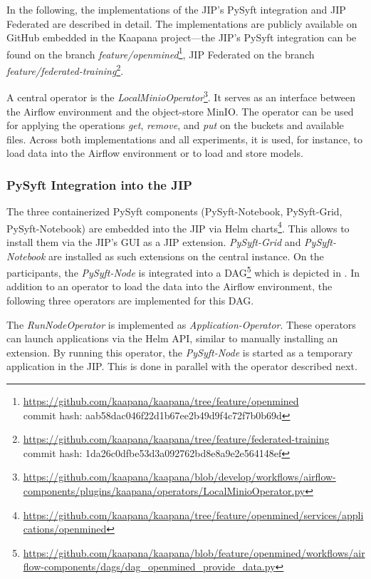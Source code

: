 In the following, the implementations of the JIP's PySyft integration and JIP Federated are described in detail.
The implementations are publicly available on GitHub embedded in the Kaapana project---the JIP's PySyft integration can be found on the branch \textit{feature/openmined}\footnote{\url{https://github.com/kaapana/kaapana/tree/feature/openmined}\\ commit hash: aab58dac046f22d1b67ee2b49d9f4c72f7b0b69d}, JIP Federated on the branch \textit{feature/federated-training}\footnote{\url{https://github.com/kaapana/kaapana/tree/feature/federated-training}\\ commit hash: 1da26c0dfbe53d3a092762bd8e8a9e2e564148ef}.

A central operator is the \textit{LocalMinioOperator}\footnote{\url{https://github.com/kaapana/kaapana/blob/develop/workflows/airflow-components/plugins/kaapana/operators/LocalMinioOperator.py}}. It serves as an interface between the Airflow environment and the object-store MinIO. The operator can be used for applying the operations \textit{get}, \textit{remove}, and \textit{put} on the buckets and available files. Across both implementations and all experiments, it is used, for instance, to load data into the Airflow environment or to load and store models.

\subsubsection{PySyft Integration into the JIP}

The three containerized PySyft components (PySyft-Notebook, PySyft-Grid, PySyft-Notebook) are embedded into the JIP via Helm charts\footnote{\url{https://github.com/kaapana/kaapana/tree/feature/openmined/services/applications/openmined}}. This allows to install them via the JIP's GUI as a JIP extension. \textit{PySyft-Grid} and \textit{PySyft-Notebook} are installed as such extensions on the central instance.
On the participants, the \textit{PySyft-Node} is integrated into a DAG\footnote{\url{https://github.com/kaapana/kaapana/blob/feature/openmined/workflows/airflow-components/dags/dag_openmined_provide_data.py}} which is depicted in . In addition to an operator to load the data into the Airflow environment, the following three operators are implemented for this DAG.

The \textit{RunNodeOperator} is implemented as \textit{Application-Operator}. These operators can launch applications via the Helm API, similar to manually installing an extension. By running this operator, the \textit{PySyft-Node} is started as a temporary application in the JIP. This is done in parallel with the operator described next.

